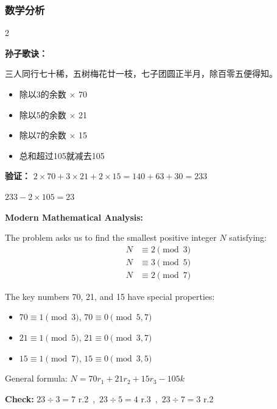 \documentclass[11pt,a4paper]{article}
\begin{document}
\subsubsection*{数学分析}
\begin{paracol}{2}
\begin{classicalbox}
\textbf{孙子歌诀：}

三人同行七十稀，五树梅花廿一枝，七子团圆正半月，除百零五便得知。

\begin{itemize}[leftmargin=1.5em,topsep=2pt,itemsep=1pt]
  \item 除以3的余数 $\times$ 70
  \item 除以5的余数 $\times$ 21
  \item 除以7的余数 $\times$ 15
  \item 总和超过105就减去105
\end{itemize}

\textbf{验证：} $2 \times 70 + 3 \times 21 + 2 \times 15 = 140 + 63 + 30 = 233$

$233 - 2 \times 105 = 23$
\end{classicalbox}
\switchcolumn
\begin{modernbox}
\textbf{Modern Mathematical Analysis:}

The problem asks us to find the smallest positive integer $N$ satisfying:
\begin{align*}
N &\equiv 2 \pmod{3} \\
N &\equiv 3 \pmod{5} \\
N &\equiv 2 \pmod{7}
\end{align*}

The key numbers 70, 21, and 15 have special properties:
\begin{itemize}[leftmargin=1.5em,topsep=2pt,itemsep=1pt]
  \item $70 \equiv 1 \pmod{3}$, $70 \equiv 0 \pmod{5,7}$
  \item $21 \equiv 1 \pmod{5}$, $21 \equiv 0 \pmod{3,7}$
  \item $15 \equiv 1 \pmod{7}$, $15 \equiv 0 \pmod{3,5}$
\end{itemize}

General formula: $N = 70r_1 + 21r_2 + 15r_3 - 105k$

\textbf{Check:} $23 \div 3 = 7$ r.2\ \checkmark,\ $23 \div 5 = 4$ r.3\ \checkmark,\ $23 \div 7 = 3$ r.2\ \checkmark
\end{modernbox}
\end{paracol}

\newpage
\end{document}
